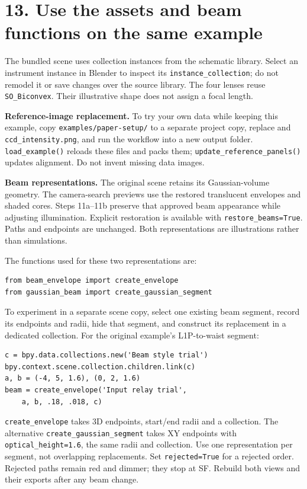 \documentclass[11pt,a4paper]{article}
\begin{document}
\clearpage
\section*{13. Use the assets and beam functions on the same example}
The bundled scene uses collection instances from the schematic library. Select an instrument instance in Blender to inspect its \texttt{instance\_collection}; do not remodel it or save changes over the source library. The four lenses reuse \texttt{SO\_Biconvex}. Their illustrative shape does not assign a focal length.

\textbf{Reference-image replacement.} To try your own data while keeping this example, copy \texttt{examples/paper-setup/} to a separate project copy, replace  and \texttt{ccd\_intensity.png}, and run the workflow into a new output folder. \texttt{load\_example()} reloads these files and packs them; \texttt{update\_reference\_panels()} updates alignment. Do not invent missing data images.

\textbf{Beam representations.} The original scene retains its Gaussian-volume geometry. The camera-search previews use the restored translucent envelopes and shaded cores. Steps 11a--11b preserve that approved beam appearance while adjusting illumination. Explicit restoration is available with \texttt{restore\_beams=True}. Paths and endpoints are unchanged. Both representations are illustrations rather than simulations.

The functions used for these two representations are:
\begin{Verbatim}[fontsize=\small]
from beam_envelope import create_envelope
from gaussian_beam import create_gaussian_segment
\end{Verbatim}
To experiment in a separate scene copy, select one existing beam segment, record its endpoints and radii, hide that segment, and construct its replacement in a dedicated collection. For the original example's L1P-to-waist segment:
\begin{Verbatim}[fontsize=\small]
c = bpy.data.collections.new('Beam style trial')
bpy.context.scene.collection.children.link(c)
a, b = (-4, 5, 1.6), (0, 2, 1.6)
beam = create_envelope('Input relay trial',
    a, b, .18, .018, c)
\end{Verbatim}
\texttt{create\_envelope} takes 3D endpoints, start/end radii and a collection. The alternative \texttt{create\_gaussian\_segment} takes XY endpoints with \texttt{optical\_height=1.6}, the same radii and collection. Use one representation per segment, not overlapping replacements. Set \texttt{rejected=True} for a rejected order. Rejected paths remain red and dimmer; they stop at SF. Rebuild both views and their exports after any beam change.
\end{document}
